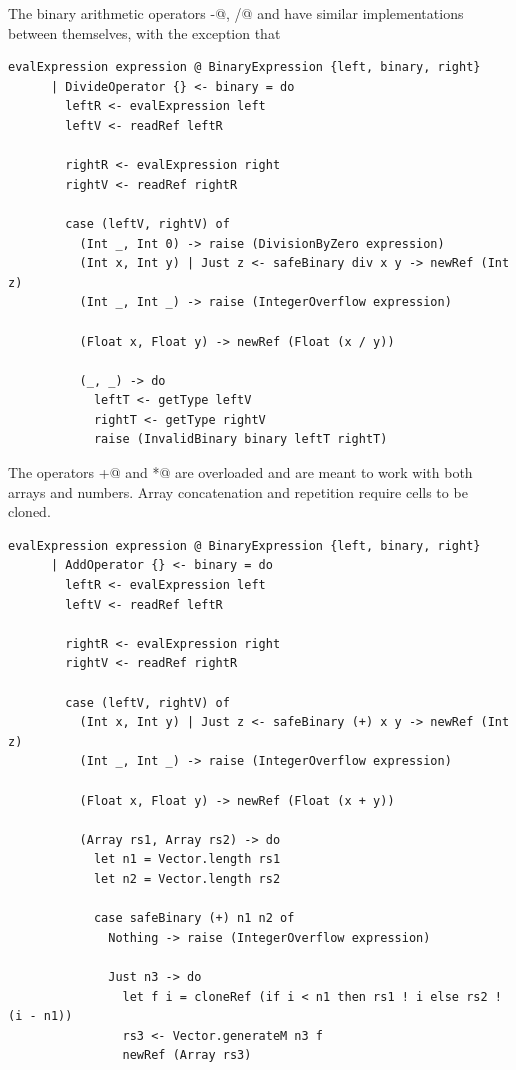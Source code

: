 \documentclass[UdineBachThesis,american,11pt]{PhdThesis}
\begin{document}
  \pagebreak

  The binary arithmetic operators \lstinline@-@, \lstinline@/@ and \lstinline@%@
  have similar implementations between themselves, with the exception that
  \lstinline@%@ supports only \lstinline@Int@s, and that both \lstinline@/@ and
  \lstinline@%@ raise an exception if the dividend is 0.

  \begin{lstlisting}[gobble=4,basicstyle=\ttfamily\small]
    evalExpression expression @ BinaryExpression {left, binary, right}
      | DivideOperator {} <- binary = do
        leftR <- evalExpression left
        leftV <- readRef leftR

        rightR <- evalExpression right
        rightV <- readRef rightR

        case (leftV, rightV) of
          (Int _, Int 0) -> raise (DivisionByZero expression)
          (Int x, Int y) | Just z <- safeBinary div x y -> newRef (Int z)
          (Int _, Int _) -> raise (IntegerOverflow expression)

          (Float x, Float y) -> newRef (Float (x / y))

          (_, _) -> do
            leftT <- getType leftV
            rightT <- getType rightV
            raise (InvalidBinary binary leftT rightT)
  \end{lstlisting}

  The operators \lstinline@+@ and \lstinline@*@ are overloaded and are meant to
  work with both arrays and numbers. Array concatenation and repetition require
  cells to be cloned.

  \begin{lstlisting}[gobble=4,basicstyle=\ttfamily\small]
    evalExpression expression @ BinaryExpression {left, binary, right}
      | AddOperator {} <- binary = do
        leftR <- evalExpression left
        leftV <- readRef leftR

        rightR <- evalExpression right
        rightV <- readRef rightR

        case (leftV, rightV) of
          (Int x, Int y) | Just z <- safeBinary (+) x y -> newRef (Int z)
          (Int _, Int _) -> raise (IntegerOverflow expression)

          (Float x, Float y) -> newRef (Float (x + y))

          (Array rs1, Array rs2) -> do
            let n1 = Vector.length rs1
            let n2 = Vector.length rs2

            case safeBinary (+) n1 n2 of
              Nothing -> raise (IntegerOverflow expression)

              Just n3 -> do
                let f i = cloneRef (if i < n1 then rs1 ! i else rs2 ! (i - n1))
                rs3 <- Vector.generateM n3 f
                newRef (Array rs3)
  \end{lstlisting}
\end{document}
